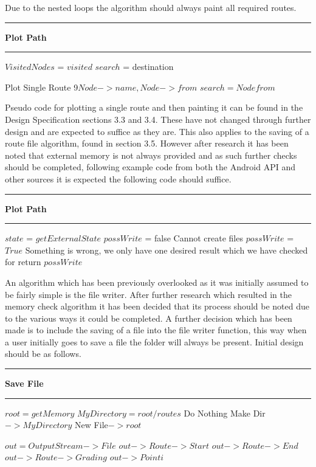 Due to the nested loops the algorithm should always paint all required routes. 
\vspace{0.3cm}
\hrule
\vspace{0.1cm}
\textbf{Plot Path}
\vspace{0.1cm}
\hrule
\vspace{0.1cm}
\begin{algorithmic}[1]
\State $Visited Nodes$ = $visited$
\State$search$ = destination
	
		\State Plot Single Route 9$Node->name, Node->from$
		\State $search = Node from$
	\EndIf
\EndFor
\EndFor
\end{algorithmic}
Pseudo code for plotting a single route and then painting it can be found in the Design Specification sections 3.3 and 3.4. These have not changed through further design and are expected to suffice as they are. This also applies to the saving of a route file algorithm, found in section 3.5. However after research it has been noted that external memory is not always provided and as such further checks should be completed, following example code from both the Android API and other sources it is expected the following code should suffice. 
\vspace{0.3cm}
\hrule
\vspace{0.1cm}
\textbf{Plot Path}
\vspace{0.1cm}
\hrule
\vspace{0.1cm}
\begin{algorithmic}[1]
\State $state$ = $getExternalState$
\State $possWrite$ = false
	\State Cannot create files
	\State $possWrite$ = $True$
\Else{}
	\State Something is wrong, we only have one desired result which we have checked for
	\EndIf
	\State return $possWrite$

\end{algorithmic}
An algorithm which has been previously overlooked as it was initially assumed to be fairly simple is the file writer. After further research which resulted in the memory check algorithm it has been decided that its process should be noted due to the various ways it could be completed. A further decision which has been made is to include the saving of a file into the file writer function, this way when a user initially goes to save a file the folder will always be present. Initial design should be as follows. 
\vspace{0.3cm}
\hrule
\vspace{0.2cm}
\textbf{Save File}
\vspace{0.1cm}
\hrule
\vspace{0.1cm}
\begin{algorithmic}[1]
\State $root = get Memory$
\State $My Directory = root/routes$
	\State Do Nothing
	\Else
\State Make Dir $->My Directory$
\EndIf
\State New File$-> root$

\State $out = Output Stream -> File$
\State $out -> Route ->Start$
\State $out -> Route -> End$
\State $out -> Route -> Grading$
	\State $out -> Point i$
\EndFor

\end{algorithmic}

